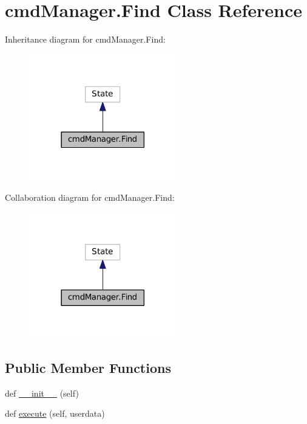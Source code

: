 \hypertarget{classcmdManager_1_1Find}{}\section{cmd\+Manager.\+Find Class Reference}
\label{classcmdManager_1_1Find}


Inheritance diagram for cmd\+Manager.\+Find\+:
\nopagebreak
\begin{figure}[H]
\begin{center}
\leavevmode
\includegraphics[width=182pt]{classcmdManager_1_1Find__inherit__graph}
\end{center}
\end{figure}


Collaboration diagram for cmd\+Manager.\+Find\+:
\nopagebreak
\begin{figure}[H]
\begin{center}
\leavevmode
\includegraphics[width=182pt]{classcmdManager_1_1Find__coll__graph}
\end{center}
\end{figure}
\subsection*{Public Member Functions}
\begin{DoxyCompactItemize}
\item 
def \hyperlink{classcmdManager_1_1Find_ac1b5934dd9654da40ee17c6b6680f7b3}{\+\_\+\+\_\+init\+\_\+\+\_\+} (self)
\item 
def \hyperlink{classcmdManager_1_1Find_abd9e8b1f15ff00ebf80384840ec4591b}{execute} (self, userdata)
\end{DoxyCompactItemize}
